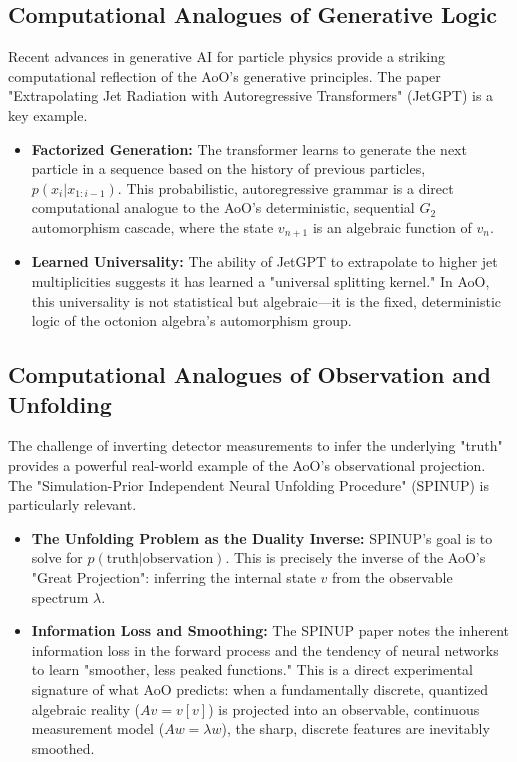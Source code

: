 \documentclass[11pt, a4paper]{article}
\theoremstyle{definition}
\theoremstyle{remark}
\begin{document}
\subsection{Computational Analogues of Generative Logic}
Recent advances in generative AI for particle physics provide a striking computational reflection of the AoO's generative principles. The paper "Extrapolating Jet Radiation with Autoregressive Transformers" (JetGPT) \cite{JetGPT} is a key example.
\begin{itemize}
    \item \textbf{Factorized Generation:} The transformer learns to generate the next particle in a sequence based on the history of previous particles, $p(x_i | x_{1:i-1})$. This probabilistic, autoregressive grammar is a direct computational analogue to the AoO's deterministic, sequential $G_2$  automorphism cascade, where the state $v_{n+1}$ is an algebraic function of $v_n$.
    \item \textbf{Learned Universality:} The ability of JetGPT to extrapolate to higher jet multiplicities suggests it has learned a "universal splitting kernel." In AoO, this universality is not statistical but algebraic—it is the fixed, deterministic logic of the octonion algebra's automorphism group.
\end{itemize}

\subsection{Computational Analogues of Observation and Unfolding}
The challenge of inverting detector measurements to infer the underlying "truth" provides a powerful real-world example of the AoO's observational projection. The "Simulation-Prior Independent Neural Unfolding Procedure" (SPINUP) \cite{SPINUP} is particularly relevant.
\begin{itemize}
    \item \textbf{The Unfolding Problem as the Duality Inverse:} SPINUP's goal is to solve for $p(\text{truth} | \text{observation})$. This is precisely the inverse of the AoO's "Great Projection": inferring the internal state $v$ from the observable spectrum $\lambda$.
    \item \textbf{Information Loss and Smoothing:} The SPINUP paper notes the inherent information loss in the forward process and the tendency of neural networks to learn "smoother, less peaked functions." This is a direct experimental signature of what AoO predicts: when a fundamentally discrete, quantized algebraic reality ($Av=v[v]$) is projected into an observable, continuous measurement model ($Aw=\lambda w$), the sharp, discrete features are inevitably smoothed.
\end{itemize}
\end{document}
